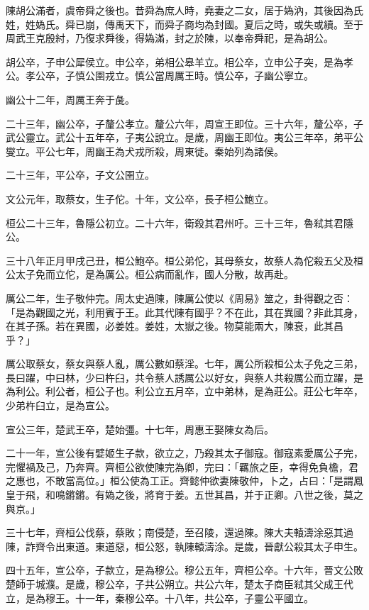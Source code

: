 
\begin{pinyinscope}
陳胡公滿者，虞帝舜之後也。昔舜為庶人時，堯妻之二女，居于媯汭，其後因為氏姓，姓媯氏。舜已崩，傳禹天下，而舜子商均為封國。夏后之時，或失或續。至于周武王克殷紂，乃復求舜後，得媯滿，封之於陳，以奉帝舜祀，是為胡公。

胡公卒，子申公犀侯立。申公卒，弟相公皋羊立。相公卒，立申公子突，是為孝公。孝公卒，子慎公圉戎立。慎公當周厲王時。慎公卒，子幽公寧立。

幽公十二年，周厲王奔于彘。

二十三年，幽公卒，子釐公孝立。釐公六年，周宣王即位。三十六年，釐公卒，子武公靈立。武公十五年卒，子夷公說立。是歲，周幽王即位。夷公三年卒，弟平公燮立。平公七年，周幽王為犬戎所殺，周東徙。秦始列為諸侯。

二十三年，平公卒，子文公圉立。

文公元年，取蔡女，生子佗。十年，文公卒，長子桓公鮑立。

桓公二十三年，魯隱公初立。二十六年，衛殺其君州吁。三十三年，魯弒其君隱公。

三十八年正月甲戌己丑，桓公鮑卒。桓公弟佗，其母蔡女，故蔡人為佗殺五父及桓公太子免而立佗，是為厲公。桓公病而亂作，國人分散，故再赴。

厲公二年，生子敬仲完。周太史過陳，陳厲公使以《周易》筮之，卦得觀之否：「是為觀國之光，利用賓于王。此其代陳有國乎？不在此，其在異國？非此其身，在其子孫。若在異國，必姜姓。姜姓，太嶽之後。物莫能兩大，陳衰，此其昌乎？」

厲公取蔡女，蔡女與蔡人亂，厲公數如蔡淫。七年，厲公所殺桓公太子免之三弟，長曰躍，中曰林，少曰杵臼，共令蔡人誘厲公以好女，與蔡人共殺厲公而立躍，是為利公。利公者，桓公子也。利公立五月卒，立中弟林，是為莊公。莊公七年卒，少弟杵臼立，是為宣公。

宣公三年，楚武王卒，楚始彊。十七年，周惠王娶陳女為后。

二十一年，宣公後有嬖姬生子款，欲立之，乃殺其太子御寇。御寇素愛厲公子完，完懼禍及己，乃奔齊。齊桓公欲使陳完為卿，完曰：「羈旅之臣，幸得免負檐，君之惠也，不敢當高位。」桓公使為工正。齊懿仲欲妻陳敬仲，卜之，占曰：「是謂鳳皇于飛，和鳴鏘鏘。有媯之後，將育于姜。五世其昌，并于正卿。八世之後，莫之與京。」

三十七年，齊桓公伐蔡，蔡敗；南侵楚，至召陵，還過陳。陳大夫轅濤涂惡其過陳，詐齊令出東道。東道惡，桓公怒，執陳轅濤涂。是歲，晉獻公殺其太子申生。

四十五年，宣公卒，子款立，是為穆公。穆公五年，齊桓公卒。十六年，晉文公敗楚師于城濮。是歲，穆公卒，子共公朔立。共公六年，楚太子商臣弒其父成王代立，是為穆王。十一年，秦穆公卒。十八年，共公卒，子靈公平國立。


\end{pinyinscope}
